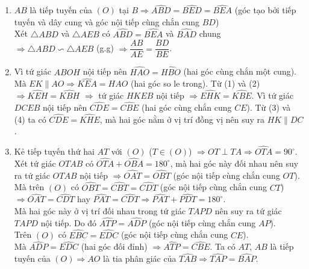 \begin{bt}
{\begin{enumerate}
			Xét tứ giác $ABOH$ có $\widehat{OHA}+\widehat{OBA}=90^\circ+90^\circ=180^\circ\Rightarrow$ tứ giác $ABOH$ nội tiếp.
			\item $AB$ là tiếp tuyến của $(O)$ tại $B\Rightarrow\widehat{ABD}=\widehat{BED}=\widehat{BEA}$ (góc tạo bởi tiếp tuyến và dây cung và góc nội tiếp cùng chắn cung $BD$)\\
			Xét $\triangle ABD$ và $\triangle AEB$ có $\widehat{ABD}=\widehat{BEA}$ và $\widehat{BAD}$ chung\\
			$\Rightarrow\triangle ABD\backsim\triangle AEB$ (g.g) $\Rightarrow\dfrac{AB}{AE}=\dfrac{BD}{BE}$.\\
			\item Vì tứ giác $ABOH$ nội tiếp nên $\widehat{HAO}=\widehat{HBO}$ (hai góc cùng chắn một cung). 
			Mà $EK\parallel AO\Rightarrow\widehat{KEA}=\widehat{HAO}$ (hai góc so le trong). 
			Từ (1) và (2) $\Rightarrow \widehat{KEH}=\widehat{KBH}$
			$\Rightarrow$ tứ giác $HKEB$ nội tiếp $\Rightarrow\widehat{EHK}=\widehat{KBE}$. 
			Vì tứ giác $DCEB$ nội tiếp nên $\widehat{CDE}=\widehat{CBE}$ (hai góc cùng chắn cung $CE$). 
			Từ (3) và (4) ta có $\widehat{CDE}=\widehat{KHE}$, mà hai góc nằm ở vị trí đồng vị nên suy ra $HK\parallel DC$.
			\item Kẻ tiếp tuyến thứ hai $AT$ với $(O)$ ($T\in (O)$)
			$\Rightarrow OT\perp TA\Rightarrow\widehat{OTA}=90^\circ$.\\
			Xét tứ giác $OTAB$ có $\widehat{OTA}+\widehat{OBA}=180^\circ$, mà hai góc này đối nhau nên suy ra tứ giác $OTAB$ nội tiếp
			$\Rightarrow \widehat{OAT}=\widehat{OBT} $ (góc nội tiếp cùng chắn cung $OT$).\\
			Mà trên $(O)$ có $\widehat{OBT}=\widehat{CBT}=\widehat{CDT}$ (góc nội tiếp cùng chắn cung $CT$)
			$\Rightarrow\widehat{OAT}=\widehat{CDT}$ hay $\widehat{PAT}=\widehat{CDT} \Rightarrow\widehat{PAT}+\widehat{PDT}=180^\circ$.\\
			Mà hai góc này ở vị trí đối nhau trong tứ giác $TAPD$ nên suy ra tứ giác $TAPD $ nội tiếp.
			Do đó $\widehat{ATP}=\widehat{ADP}$ (góc nội tiếp cùng chắn cung $AP$).\\
			Trên $(O)$ có $\widehat{EBC}=\widehat{EDC}$ (góc nội tiếp cùng chắn cung $CE$).\\
			Mà $\widehat{ADP}=\widehat{EDC}$ (hai góc đối đỉnh) $\Rightarrow\widehat{ATP}=\widehat{CBE}$. 
			Ta có $AT$, $AB$ là tiếp tuyến của $(O)\Rightarrow AO$ là tia phân giác của $\widehat{TAB}\Rightarrow\widehat{TAP}=\widehat{BAP}$.\\

\end{enumerate}}
\end{bt}
